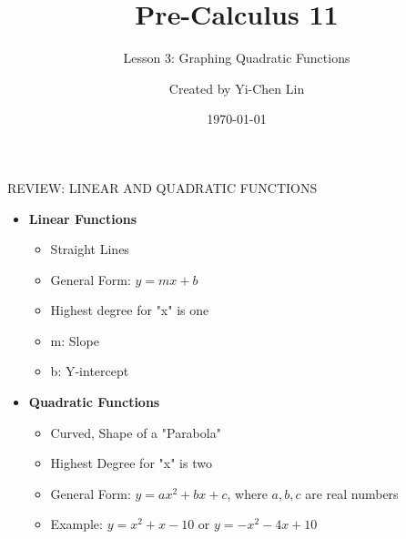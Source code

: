 \documentclass[aspectratio=169]{beamer}
\title{Pre-Calculus 11}
\subtitle{Lesson 3: Graphing Quadratic Functions}
\author{Created by Yi-Chen Lin}
\date{\today}
\begin{document}
\begin{frame}
    \titlepage
\end{frame}

\begin{frame}{REVIEW: LINEAR AND QUADRATIC FUNCTIONS}
    \begin{tcolorbox}[colback=lightgray,colframe=primary,title=Key Concepts]
        \footnotesize
        \begin{itemize}
            \item \textbf{Linear Functions}
            \begin{itemize}
                \item Straight Lines
                \item General Form: $y = mx + b$
                \item Highest degree for "x" is one
                \item m: Slope
                \item b: Y-intercept
            \end{itemize}
            \item \textbf{Quadratic Functions}
            \begin{itemize}
                \item Curved, Shape of a "Parabola"
                \item Highest Degree for "x" is two
                \item General Form: $y = ax^2 + bx + c$, where $a, b, c$ are real numbers
                \item Example: $y = x^2 + x - 10$ or $y = -x^2 - 4x + 10$
            \end{itemize}
        \end{itemize}
    \end{tcolorbox}
\end{frame}
\end{document}
